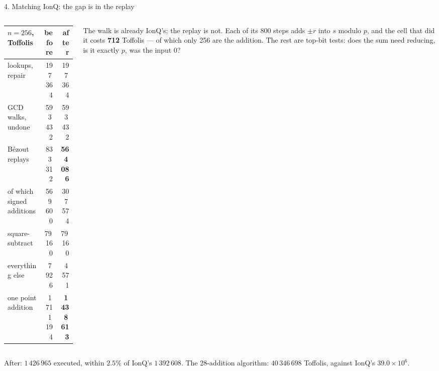 \documentclass[aspectratio=169,11pt]{beamer}
\begin{document}
\begin{frame}{4. Matching IonQ: the gap is in the replay}
  \begin{columns}[T]
    \begin{column}{0.55\textwidth}
      \centering\footnotesize
      \renewcommand{\arraystretch}{1.12}
      \begin{tabular}{@{}lrr@{}}
        \toprule
        $n=256$, Toffolis & before & after \\
        \midrule
        lookups, repair & 197\,364 & 197\,364 \\
        GCD walks, undone & 593\,432 & 593\,432 \\
        Bézout replays & 833\,312 & \textbf{564\,086} \\
        \quad of which signed additions & 569\,600 & 307\,574 \\
        square-subtract & 79\,160 & 79\,160 \\
        everything else & 7\,926 & 4\,571 \\
        \midrule
        one point addition & 1\,711\,194 & \textbf{1\,438\,613} \\
        \bottomrule
      \end{tabular}
    \end{column}
    \begin{column}{0.41\textwidth}
      \small The walk is already IonQ's; the replay is not. Each of its 800 steps adds $\pm r$ into $s$ modulo $p$, and the cell that did it costs \textbf{712} Toffolis --- of which only 256 are the addition.
      \vskip2mm
      The rest are top-bit tests: does the sum need reducing, is it exactly $p$, was the input $0$?
    \end{column}
  \end{columns}
  \vskip2mm
  {\small\raggedright After: $1\,426\,965$ executed, within $2.5\%$ of IonQ's $1\,392\,608$. The 28-addition algorithm: $40\,346\,698$ Toffolis, against IonQ's $39.0\times10^6$.\par}
\end{frame}
\end{document}
